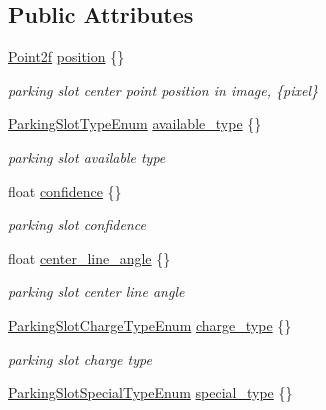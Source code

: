 \subsection*{Public Attributes}
\begin{DoxyCompactItemize}
\item 
\hyperlink{structmaf__perception__interface_1_1Point2f}{Point2f} \hyperlink{structmaf__perception__interface_1_1ParkingSlotCenterPoint_a78df59b8b09eb1dc612f505fb8537e87}{position} \{\}
\begin{DoxyCompactList}\small\item\em parking slot center point position in image, \{pixel\} \end{DoxyCompactList}\item 
\hyperlink{structmaf__perception__interface_1_1ParkingSlotTypeEnum}{Parking\+Slot\+Type\+Enum} \hyperlink{structmaf__perception__interface_1_1ParkingSlotCenterPoint_a9bd39540439a6cb4e3eb6655bf4f0a10}{available\+\_\+type} \{\}
\begin{DoxyCompactList}\small\item\em parking slot available type \end{DoxyCompactList}\item 
float \hyperlink{structmaf__perception__interface_1_1ParkingSlotCenterPoint_a14d2549831817c0ce7a52eea14e5b5f7}{confidence} \{\}
\begin{DoxyCompactList}\small\item\em parking slot confidence \end{DoxyCompactList}\item 
float \hyperlink{structmaf__perception__interface_1_1ParkingSlotCenterPoint_a353c2958432a0a157a6d6f8a2c002808}{center\+\_\+line\+\_\+angle} \{\}
\begin{DoxyCompactList}\small\item\em parking slot center line angle \end{DoxyCompactList}\item 
\hyperlink{structmaf__perception__interface_1_1ParkingSlotChargeTypeEnum}{Parking\+Slot\+Charge\+Type\+Enum} \hyperlink{structmaf__perception__interface_1_1ParkingSlotCenterPoint_aa35e43aa3dff53bb3b590932c0e5506d}{charge\+\_\+type} \{\}
\begin{DoxyCompactList}\small\item\em parking slot charge type \end{DoxyCompactList}\item 
\hyperlink{structmaf__perception__interface_1_1ParkingSlotSpecialTypeEnum}{Parking\+Slot\+Special\+Type\+Enum} \hyperlink{structmaf__perception__interface_1_1ParkingSlotCenterPoint_aa869cf76ece560c6c2ab3038aca91a1f}{special\+\_\+type} \{\}

\end{DoxyCompactItemize}
